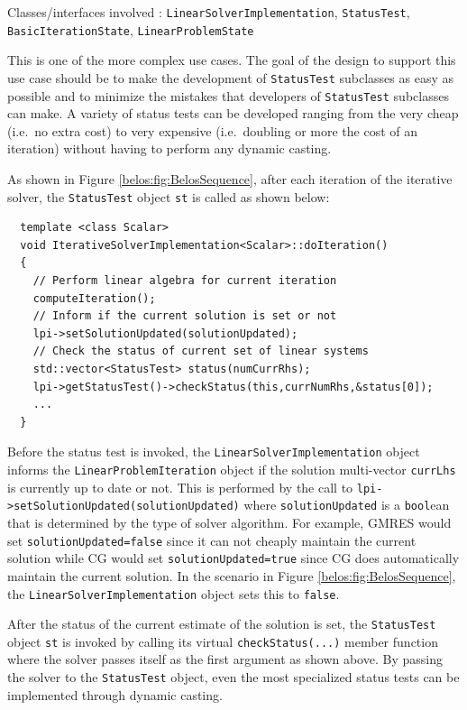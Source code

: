 \documentclass[pdf,ps2pdf,11pt]{SANDreport}
\begin{document}
\begin{enumerate}
{}\noindent{}Classes/interfaces involved :
{}\texttt{Linear\-Solver\-Implementation}, {}\texttt{Status\-Test},
{}\texttt{Basic\-Iteration\-State}, {}\texttt{Linear\-Problem\-State}

This is one of the more complex use cases.  The goal of the design to
support this use case should be to make the development of
{}\texttt{Status\-Test} subclasses as easy as possible and to minimize
the mistakes that developers of {}\texttt{Status\-Test} subclasses can
make.  A variety of status tests can be developed ranging from the
very cheap (i.e.~no extra cost) to very expensive (i.e.~doubling or
more the cost of an iteration) without having to perform any dynamic
casting.

As shown in Figure {}\ref{belos:fig:BelosSequence}, after each
iteration of the iterative solver, the {}\texttt{Status\-Test} object
{}\texttt{st} is called as shown below:

{\scriptsize\begin{verbatim}
  template <class Scalar>
  void IterativeSolverImplementation<Scalar>::doIteration()
  {
    // Perform linear algebra for current iteration
    computeIteration();
    // Inform if the current solution is set or not
    lpi->setSolutionUpdated(solutionUpdated);
    // Check the status of current set of linear systems
    std::vector<StatusTest> status(numCurrRhs);
    lpi->getStatusTest()->checkStatus(this,currNumRhs,&status[0]);
    ...
  }
\end{verbatim}}

Before the status test is invoked, the
{}\texttt{Linear\-Solver\-Implementation} object informs the
{}\texttt{Linear\-Problem\-Iteration} object if the solution
multi-vector {}\texttt{currLhs} is currently up to date or not.  This
is performed by the call to
{}\texttt{lpi->\-set\-Solution\-Updated(\-solution\-Updated\-)} where
{}\texttt{solution\-Updated} is a {}\texttt{bool}ean that is
determined by the type of solver algorithm.  For example, GMRES would
set {}\texttt{solution\-Updated=false} since it can not cheaply
maintain the current solution while CG would set
{}\texttt{solution\-Updated=true} since CG does automatically maintain
the current solution.  In the scenario in Figure
{}\ref{belos:fig:BelosSequence}, the
{}\texttt{Linear\-Solver\-Implementation} object sets this to
{}\texttt{false}.

After the status of the current estimate of the solution is set, the
{}\texttt{Status\-Test} object {}\texttt{st} is invoked by calling its
virtual {}\texttt{checkStatus(...)} member function where the solver
passes itself as the first argument as shown above. By passing the
solver to the {}\texttt{Status\-Test} object, even the most
specialized status tests can be implemented through dynamic casting.


\end{enumerate}
\end{document}
